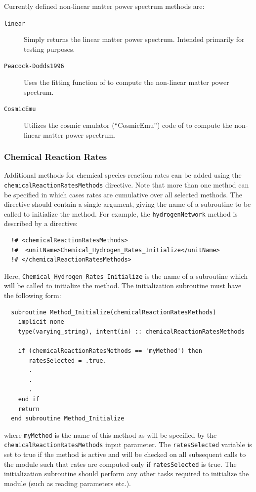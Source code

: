 Currently defined non-linear matter power spectrum methods are:
\begin{description}
 \item [{\tt linear}] Simply returns the linear matter power spectrum. Intended primarily for testing purposes.
 \item [{\tt Peacock-Dodds1996}] Uses the fitting function of \cite{peacock_non-linear_1996} to compute the non-linear matter power spectrum.
 \item [{\tt CosmicEmu}] Utilizes the cosmic emulator (``CosmicEmu'') code of \cite{lawrence_coyote_2010} to compute the non-linear matter power spectrum.
\end{description}

\subsubsection{Chemical Reaction Rates}

Additional methods for chemical species reaction rates can be added using the {\tt chemicalReactionRatesMethods} directive. Note that more than one method can be specified in which cases rates are cumulative over all selected methods. The directive should contain a single argument, giving the name of a subroutine to be called to initialize the method. For example, the {\tt hydrogenNetwork} method is described by a directive:
\begin{verbatim}
  !# <chemicalReactionRatesMethods>
  !#  <unitName>Chemical_Hydrogen_Rates_Initialize</unitName>
  !# </chemicalReactionRatesMethods>
\end{verbatim}
Here, {\tt Chemical\_Hydrogen\_Rates\_Initialize} is the name of a subroutine which will be called to initialize the method. The initialization subroutine must have the following form:
\begin{verbatim}
  subroutine Method_Initialize(chemicalReactionRatesMethods)
    implicit none
    type(varying_string), intent(in) :: chemicalReactionRatesMethods
    
    if (chemicalReactionRatesMethods == 'myMethod') then
       ratesSelected = .true.
       .
       .
       .
    end if
    return
  end subroutine Method_Initialize
\end{verbatim}
where {\tt myMethod} is the name of this method as will be specified by the {\tt chemicalReactionRatesMethods} input parameter. The {\tt ratesSelected} variable is set to true if the method is active and will be checked on all subsequent calls to the module such that rates are computed only if {\tt ratesSelected} is true. The initialization subroutine should perform any other tasks required to initialize the module (such as reading parameters etc.).

